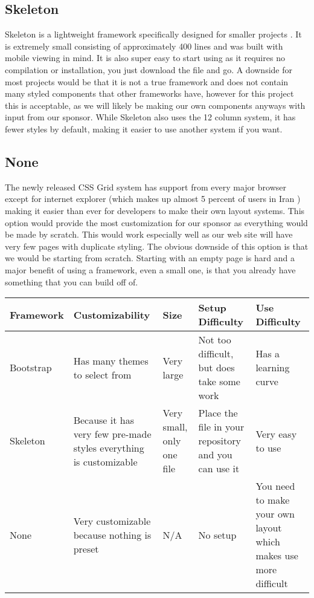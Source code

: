 \documentclass[onecolumn, draftclsnofoot,10pt, compsoc]{IEEEtran}
\begin{document}
    \subsection{Skeleton}
    Skeleton is a lightweight framework specifically designed for smaller projects \cite{IEEEhowto:Skeleton}. It is extremely small consisting of approximately 400 lines and was built with mobile viewing in mind. It is also super easy to start using as it requires no compilation or installation, you just download the file and go. A downside for most projects would be that it is not a true framework and does not contain many styled components that other frameworks have, however for this project this is acceptable, as we will likely be making our own components anyways with input from our sponsor. While Skeleton also uses the 12 column system, it has fewer styles by default, making it easier to use another system if you want.
    \subsection{None}
    The newly released CSS Grid system has support from every major browser except for internet explorer (which makes up almost 5 percent of users in Iran \cite{IEEEhowto:CanIUseGrid}) making it easier than ever for developers to make their own layout systems. This option would provide the most customization for our sponsor as everything would be made by scratch. This would work especially well as our web site will have very few pages with duplicate styling. The obvious downside of this option is that we would be starting from scratch. Starting with an empty page is hard and a major benefit of using a framework, even a small one, is that you already have something that you can build off of.
    \newline
    \newline
    \begin{tabular}{|l|p{4cm}|p{2cm}|p{4cm}|p{4cm}|}
         \hline
         Framework & Customizability & Size & Setup Difficulty & Use Difficulty \\ \hline
         
         Bootstrap & Has many themes to select from & Very large & Not too difficult, but does take some work & Has a learning curve \\ \hline
         
         Skeleton & Because it has very few pre-made styles everything is customizable & Very small, only one file & Place the file in your repository and you can use it & Very easy to use \\ \hline
         
         None & Very customizable because nothing is preset & N/A & No setup & You need to make your own layout which makes use more difficult\\ \hline
    \end{tabular}
\end{document}
